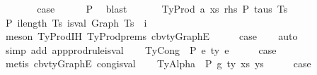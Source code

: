 \begin{isabellebody}
\ \ \ \ \isamarkupfalse%
\ \isamarkupfalse%
\ {\isacharquery}{\kern0pt}case\isanewline
\ \ \ \ \isamarkupfalse%
\ P{}\ \isamarkupfalse%
\ blast\isanewline
\ \ \isamarkupfalse%
\isanewline
{}\isamarkupfalse%
\isanewline
\ \ \isamarkupfalse%
\ {\isacharparenleft}{\kern0pt}TyProd\ a\ xs\ rhs\ P\ taus\ Ts\ {\isasymGamma}{\isacharparenright}{\kern0pt}\isanewline
\ \ \isamarkupfalse%
\ P{}{\isacharcolon}{\kern0pt}\ {\isachardoublequoteopen}{\isasymforall}i{\isacharless}{\kern0pt}length\ Ts{\isachardot}{\kern0pt}\ is{\isacharunderscore}{\kern0pt}val\ {\isacharparenleft}{\kern0pt}Graph\ {\isacharparenleft}{\kern0pt}Ts\ {\isacharbang}{\kern0pt}\ i{\isacharparenright}{\kern0pt}{\isacharparenright}{\kern0pt}{\isachardoublequoteclose}\isanewline
\ \ \ \ \isamarkupfalse%
\ {\isacharparenleft}{\kern0pt}meson\ TyProd{\isachardot}{\kern0pt}IH\ TyProd{\isachardot}{\kern0pt}prems\ cbv{\isacharunderscore}{\kern0pt}ty{\isacharunderscore}{\kern0pt}GraphE{\isacharparenright}{\kern0pt}\isanewline
\ \ \isamarkupfalse%
\ \isamarkupfalse%
\ {\isacharquery}{\kern0pt}case\isanewline
\ \ \isamarkupfalse%
\ auto\isanewline
\ \ \isamarkupfalse%
\ {\isacharparenleft}{\kern0pt}simp\ add{\isacharcolon}{\kern0pt}\ app{\isacharunderscore}{\kern0pt}prodrule{\isacharunderscore}{\kern0pt}is{\isacharunderscore}{\kern0pt}val{\isacharparenright}{\kern0pt}\isanewline
{}\isamarkupfalse%
\isanewline
\ \ \isamarkupfalse%
\ {\isacharparenleft}{\kern0pt}TyCong\ {\isasymGamma}\ P\ e{}\ ty\ e{}{\isacharparenright}{\kern0pt}\isanewline
\ \ \isamarkupfalse%
\ \isamarkupfalse%
\ {\isacharquery}{\kern0pt}case\isanewline
\ \ \isamarkupfalse%
\ {\isacharparenleft}{\kern0pt}metis\ cbv{\isacharunderscore}{\kern0pt}ty{\isacharunderscore}{\kern0pt}GraphE\ cong{\isacharunderscore}{\kern0pt}is{\isacharunderscore}{\kern0pt}val{\isacharparenright}{\kern0pt}\isanewline
{}\isamarkupfalse%
\isanewline
\ \ \isamarkupfalse%
\ {\isacharparenleft}{\kern0pt}TyAlpha\ {\isasymGamma}{}\ P\ g\ ty\ xs\ ys{\isacharparenright}{\kern0pt}\isanewline
\ \ \isamarkupfalse%
\ \isamarkupfalse%
\ {\isacharquery}{\kern0pt}case\isanewline
\ \ \isamarkupfalse%

\end{isabellebody}

